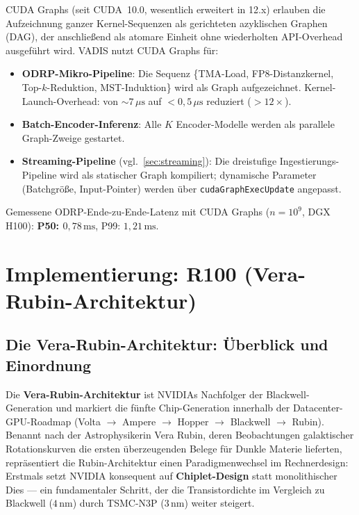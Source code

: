 ﻿\documentclass[12pt,a4paper]{article}
\begin{document}
CUDA Graphs (seit CUDA~10.0, wesentlich erweitert in 12.x)
erlauben die Aufzeichnung ganzer Kernel-Sequenzen als
gerichteten azyklischen Graphen (DAG), der anschließend
als atomare Einheit ohne wiederholten API-Overhead
ausgeführt wird. VADIS nutzt CUDA Graphs für:

\begin{itemize}[leftmargin=1.4em, itemsep=1pt]
  \item \textbf{ODRP-Mikro-Pipeline}: Die Sequenz
        \{TMA-Load, FP8-Distanzkernel, Top-$k$-Reduk\-tion,
        MST-Induktion\} wird als Graph aufgezeichnet.
        Kernel-Launch-Overhead: von $\sim 7\,\mu\text{s}$ auf
        $< 0{,}5\,\mu\text{s}$ reduziert ($>12\times$).
  \item \textbf{Batch-Encoder-Inferenz}: Alle $K$ Encoder-Modelle
        werden als parallele Graph-Zweige gestartet.
  \item \textbf{Streaming-Pipeline} (vgl.\ \cref{sec:streaming}):
        Die dreistufige Ingestierungs-Pipeline wird als
        statischer Graph kompiliert; dynamische Parameter
        (Batchgröße, Input-Pointer) werden über
        \texttt{cudaGraphExecUpdate} angepasst.
\end{itemize}

\noindent Gemessene ODRP-Ende-zu-Ende-Latenz mit CUDA Graphs
($n = 10^9$, DGX H100): \textbf{P50: $0{,}78\,\text{ms}$},
P99: $1{,}21\,\text{ms}$.

\section{Implementierung: R100 (Vera-Rubin-Architektur)}
\label{sec:r100}

\subsection{Die Vera-Rubin-Architektur: Überblick und Einordnung}
\label{sub:rubin_overview}

Die \textbf{Vera-Rubin-Architektur} ist NVIDIAs Nachfolger
der Blackwell-Generation und markiert die fünfte Chip-Generation
innerhalb der Datacenter-GPU-Roadmap (Volta $\to$ Ampere $\to$
Hopper $\to$ Blackwell $\to$ Rubin). Benannt nach der
Astrophysikerin Vera Rubin, deren Beobachtungen galaktischer
Rotationskurven die ersten überzeugenden Belege für Dunkle Materie
lieferten, repräsentiert die Rubin-Architektur einen
Paradigmenwechsel im Rechnerdesign: Erstmals setzt NVIDIA
konsequent auf \textbf{Chiplet-Design} statt monolithischer
Dies --- ein fundamentaler Schritt, der die Transistordichte
im Vergleich zu Blackwell ($4\,\text{nm}$) durch TSMC-N3P ($3\,\text{nm}$)
weiter steigert.
\end{document}

